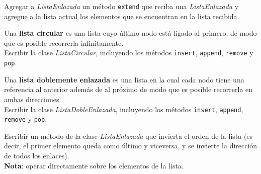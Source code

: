 \begin{ejercicio}
Agregar a {\it ListaEnlazada} un método \verb!extend! que reciba una {\it
ListaEnlazada} y agregue a la lista actual los elementos que se encuentran
en la lista recibida.
\end{ejercicio}

%

\begin{ejercicio}
Una {\bf lista circular} es una lista cuyo último nodo está ligado al primero,
de modo que es posible recorrerla infinitamente.  \\
Escribir la clase {\it ListaCircular}, incluyendo los métodos \verb!insert!,
\verb!append!, \verb!remove! y \verb!pop!.
\end{ejercicio}

\begin{ejercicio}
Una {\bf lista doblemente enlazada} es una lista en la cual cada nodo tiene
una referencia al anterior además de al próximo de modo que es posible
recorrerla en ambas direcciones. \\
Escribir la clase {\it ListaDobleEnlazada}, incluyendo los métodos
\verb!insert!, \verb!append!, \verb!remove! y \verb!pop!.
\end{ejercicio}

\begin{ejercicio}
Escribir un método de la clase {\it ListaEnlazada} que invierta el orden
de la lista (es decir, el primer elemento queda como último y
viceversa, y se invierte la dirección de todos los enlaces). \\
{\bf Nota}: operar directamente sobre los elementos de la lista.
\end{ejercicio}


